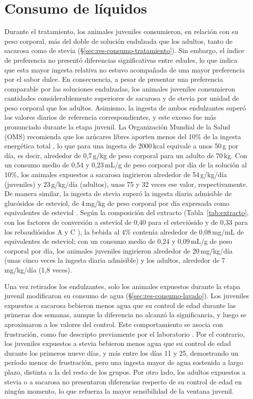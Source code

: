 \section{Consumo de líquidos}\label{sec:disc-consumo}

Durante el tratamiento, los animales juveniles consumieron, en relación con su peso corporal, más del doble de solución endulzada que los adultos, tanto de sacarosa como de stevia (\S\ref{sec:res-consumo-tratamiento}). Sin embargo, el índice de preferencia no presentó diferencias significativas entre edades, lo que indica que esta mayor ingesta relativa no estuvo acompañada de una mayor preferencia por el sabor dulce. En consecuencia, a pesar de presentar una preferencia comparable por las soluciones endulzadas, los animales juveniles consumieron cantidades considerablemente superiores de sacarosa y de stevia por unidad de peso corporal que los adultos. Asimismo, la ingesta de ambos endulzantes superó los valores diarios de referencia correspondientes, y este exceso fue más pronunciado durante la etapa juvenil. La Organización Mundial de la Salud (OMS) recomienda que los azúcares libres aporten menos del 10\% de la ingesta energética total \cite{who2015sugars}, lo que para una ingesta de 2000\,kcal equivale a unos 50\,g por día, es decir, alrededor de 0,7\,g/kg de peso corporal para un adulto de 70\,kg. Con un consumo medio de 0,54 y 0,23\,mL/g de peso corporal por día de la solución al 10\%, los animales expuestos a sacarosa ingirieron alrededor de 54\,g/kg/día (juveniles) y 23\,g/kg/día (adultos), unas 75 y 32 veces ese valor, respectivamente. De manera similar, la ingesta de stevia superó la ingesta diaria admisible de glucósidos de esteviol, de 4\,mg/kg de peso corporal por día expresada como equivalentes de esteviol \cite{efsa2010steviol}. Según la composición del extracto (Tabla~\ref{tab:extracto}, con los factores de conversión a esteviol de 0,40 para el esteviósido y de 0,33 para los rebaudiósidos A y C \cite{efsa2010steviol}), la bebida al 4\% contenía alrededor de 0,08\,mg/mL de equivalentes de esteviol; con un consumo medio de 0,24 y 0,09\,mL/g de peso corporal por día, los animales juveniles ingirieron alrededor de 20\,mg/kg/día (unas cinco veces la ingesta diaria admisible) y los adultos, alrededor de 7\,mg/kg/día (1,8 veces).

Una vez retirados los endulzantes, solo los animales expuestos durante la etapa juvenil modificaron su consumo de agua (\S\ref{sec:res-consumo-lavado}). Los juveniles expuestos a sacarosa bebieron menos agua que su control de edad durante las primeras dos semanas, aunque la diferencia no alcanzó la significancia, y luego se aproximaron a los valores del control. Este comportamiento se asocia con frustración, como fue descripto previamente por el laboratorio \cite{kruse2019sucrose}. Por el contrario, los juveniles expuestos a stevia bebieron menos agua que su control de edad durante los primeros nueve días, y más entre los días 11 y 25, demostrando un período menor de frustración, pero una ingesta mayor de agua sostenida a largo plazo, distinta a la del resto de los grupos. Por otro lado, los adultos expuestos a stevia o a sacarosa no presentaron diferencias respecto de su control de edad en ningún momento, lo que refuerza la mayor sensibilidad de la ventana juvenil.

